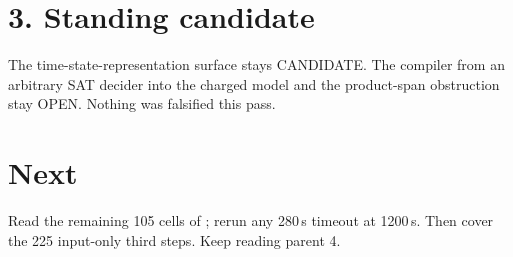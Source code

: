 \documentclass[11pt]{article}
\begin{document}
\section*{3. Standing candidate}
The time-state-representation surface stays CANDIDATE. The compiler from an arbitrary SAT decider into the charged model and the product-span obstruction stay OPEN. Nothing was falsified this pass.

\section*{Next}
Read the remaining 105 cells of ; rerun any 280\,s timeout at 1200\,s. Then cover the 225 input-only third steps. Keep reading parent 4.
\end{document}

